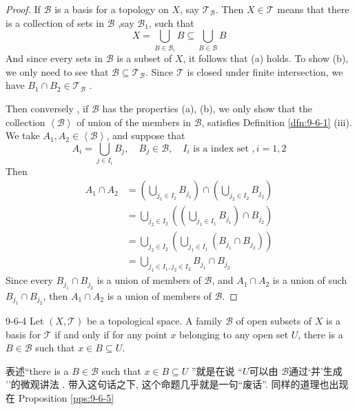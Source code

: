 \documentclass[../main.tex]{subfiles}
\begin{document}
\begin{proof}
    If \(  \mathcal{B}  \) is a basis for a topology on \(  X  \), say \(  \mathcal{T}_{\mathcal{B}}  \). Then \(  X \in \mathcal{T}  \) means that there is a collection of sets in \(  \mathcal{B}  \) ,say \(  \mathcal{B}_{1}  \), such that \[
    X = \bigcup _{B\in \mathcal{B}_{i}}B\subseteq \bigcup _{B\in \mathcal{B}}B
    \]      And since every sets in \(  \mathcal{B}  \) is a subset of \(  X  \), it follows that (a) holds. To show (b), we only need to see that \(  \mathcal{B}\subseteq  \mathcal{T}_{\mathcal{B}} \). Since \(  \mathcal{T}  \) is closed under finite intersection, we have \(  B_1\cap B_2\in  \mathcal{T}_{\mathcal{B}}  \)    .
    
    Then conversely , if  \(  \mathcal{B}  \) has the properties (a), (b), we only show that  the collection \(  \left<\mathcal{B} \right>  \) of union of the members in \(  \mathcal{B}  \),  satisfies Definition \ref{dfn:9-6-1} (iii). We take \(   A_1,A_2 \in \left<\mathcal{B} \right>  \), and suppose that \[
    A_{i}= \bigcup _{j \in I_{i}}B_{j},\quad B_{j}\in \mathcal{B}, \quad I_{i}\text{ is a index set },i= 1,2
    \] Then \[
   \begin{aligned}
    A_1\cap A_2&= \left( \bigcup _{j_1\in I_1}B_{j_1} \right) \cap \left( \bigcup _{j_2\in I_2}B_{j_2} \right)  \\ 
     &= \bigcup _{j_2 \in I_2}\left( \left( \bigcup _{j_1\in I_1}B_{j_1} \right) \cap B_{j_2} \right) \\ 
      &= \bigcup _{j_2\in I_2}\left( \bigcup _{j_1\in I_1} \left( B_{j_1} \cap B_{j_2}\right)  \right)\\ 
       &= \bigcup _{j_1\in I_1,j_2\in I_2}B_{j_1}\cap B_{j_2} 
   \end{aligned}
    \] Since every \(  B_{j_1}\cap B_{j_2}  \) is a union of members of \(  \mathcal{B}  \), and \(  A_1\cap A_2  \) is a union of such \(  B_{j_1}\cap B_{j_2}  \), then \(  A_1\cap A_2  \) is a union of members of \(  \mathcal{B}  \).       
\end{proof}

\begin{proposition}{}{9-6-4}
Let $(X, \mathcal{T})$ be a topological space. A family $\mathcal{B}$ of open subsets of $X$ is a basis for $\mathcal{T}$ if and only if for any point $x$ belonging to any open set $U$, there is a $B \in \mathcal{B}$ such that $x \in B \subseteq U$.
\end{proposition}

\begin{remark}
    表述``there is a \(  B \in \mathcal{B}  \) such that \(  x \in B\subseteq U  \)  ''就是在说  ``\(  U  \)可以由 \(  \mathcal{B}  \)通过`并'生成  ''的微观讲法 . 带入这句话之下, 这个命题几乎就是一句``废话''. 同样的道理也出现在 Proposition \ref{pps:9-6-5}
\end{remark}
\end{document}
